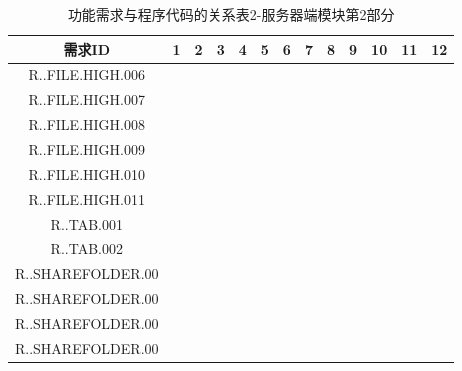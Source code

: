 \begin{table}[htbp]
\centering
\caption{功能需求与程序代码的关系表2-服务器端模块第2部分} \label{tab:requirement-module}
\begin{tabular}{|c|c|c|c|c|c|c|c|c|c|c|c|c|}
    \hline 
    需求ID & 1 & 2 & 3 & 4 & 5 & 6 & 7 & 8 & 9 & 10 & 11 & 12 \\    
    \hline 
    R..FILE.HIGH.006 &&&&&&&&&&&& \\
    \hline
    R..FILE.HIGH.007 &&&&&&&&&&&& \\
    \hline 
    R..FILE.HIGH.008 &&&&&&&&&&&& \\
    \hline
    R..FILE.HIGH.009 &&&&&&&&&&&& \\
    \hline
    R..FILE.HIGH.010 &&&&&&&&&&&& \\
    \hline
    R..FILE.HIGH.011 &&&&&&&&&&&& \\
    \hline
    R..TAB.001 &&&&&&&&&&&& \\
    \hline 
    R..TAB.002 &&&&&&&&&&&& \\
    \hline
    R..SHAREFOLDER.00 &&&&&&&&&&&& \\
    \hline
    R..SHAREFOLDER.00 &&&&&&&&&&&& \\
    \hline
    R..SHAREFOLDER.00 &&&&&&&&&&&& \\ 
    \hline
    R..SHAREFOLDER.00 &&&&&&&&&&&& \\
    \hline
\end{tabular}
\end{table}
